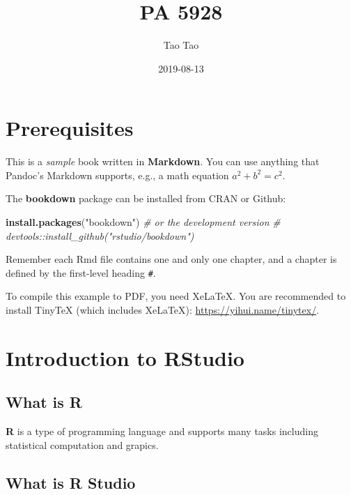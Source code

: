 \documentclass[]{book}
\title{PA 5928}
\author{Tao Tao}
\date{2019-08-13}
\newenvironment{Shaded}{\begin{snugshade}}{\end{snugshade}}
\newcommand{\CommentTok}[1]{\textcolor[rgb]{0.56,0.35,0.01}{\textit{#1}}}
\newcommand{\KeywordTok}[1]{\textcolor[rgb]{0.13,0.29,0.53}{\textbf{#1}}}
\newcommand{\NormalTok}[1]{#1}
\newcommand{\StringTok}[1]{\textcolor[rgb]{0.31,0.60,0.02}{#1}}
\begin{document}
\maketitle

{
\setcounter{tocdepth}{1}
\tableofcontents
}
\hypertarget{prerequisites}{%
\chapter{Prerequisites}\label{prerequisites}}

This is a \emph{sample} book written in \textbf{Markdown}. You can use anything that Pandoc's Markdown supports, e.g., a math equation \(a^2 + b^2 = c^2\).

The \textbf{bookdown} package can be installed from CRAN or Github:

\begin{Shaded}
\begin{Highlighting}[]
\KeywordTok{install.packages}\NormalTok{(}\StringTok{"bookdown"}\NormalTok{)}
\CommentTok{# or the development version}
\CommentTok{# devtools::install_github("rstudio/bookdown")}
\end{Highlighting}
\end{Shaded}

Remember each Rmd file contains one and only one chapter, and a chapter is defined by the first-level heading \texttt{\#}.

To compile this example to PDF, you need XeLaTeX. You are recommended to install TinyTeX (which includes XeLaTeX): \url{https://yihui.name/tinytex/}.

\hypertarget{introduction-to-rstudio}{%
\chapter{Introduction to RStudio}\label{introduction-to-rstudio}}

\hypertarget{what-is-r}{%
\section{What is R}\label{what-is-r}}

\textbf{R} is a type of programming language and supports many tasks including statistical computation and grapics.

\hypertarget{what-is-r-studio}{%
\section{What is R Studio}\label{what-is-r-studio}}
\end{document}
